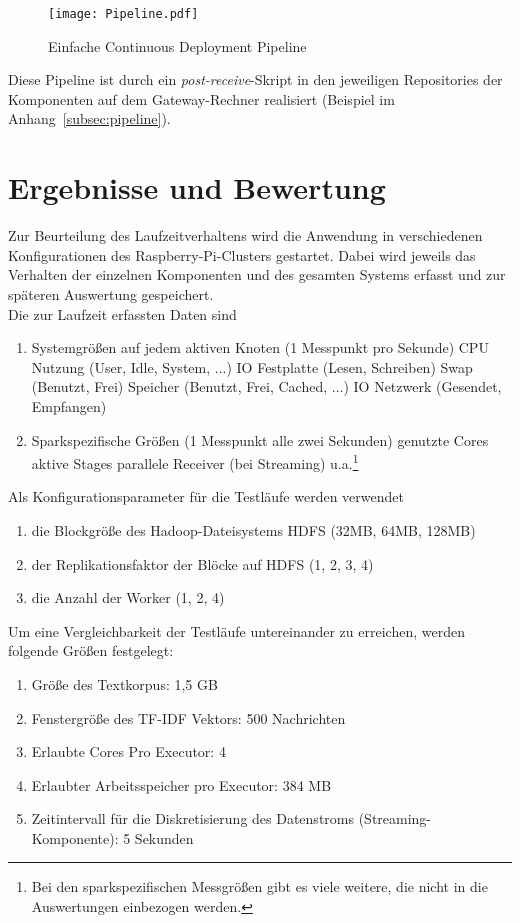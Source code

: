 \begin{figure}[ht!]
	\centering
  \texttt{[image: Pipeline.pdf]}
	\caption{Einfache Continuous Deployment Pipeline}
	\label{figure:cd_pipeline}
\end{figure}

Diese Pipeline ist durch ein \textit{post-receive}-Skript in den jeweiligen Repositories der Komponenten auf dem Gateway-Rechner realisiert (Beispiel im Anhang~\ref{subsec:pipeline}).\\


\section{Ergebnisse und Bewertung}

Zur Beurteilung des Laufzeitverhaltens wird die Anwendung in verschiedenen Konfigurationen des Raspberry-Pi-Clusters gestartet. Dabei wird jeweils das Verhalten der einzelnen Komponenten und des gesamten Systems erfasst und zur späteren Auswertung gespeichert.\\

Die zur Laufzeit erfassten Daten sind
\begin{enumerate}
	\item Systemgrößen auf jedem aktiven Knoten (1 Messpunkt pro Sekunde)
	\subitem CPU Nutzung (User, Idle, System, ...)
	\subitem IO Festplatte (Lesen, Schreiben)
	\subitem Swap (Benutzt, Frei)
	\subitem Speicher (Benutzt, Frei, Cached, ...)
	\subitem IO Netzwerk (Gesendet, Empfangen)
	\item Sparkspezifische Größen (1 Messpunkt alle zwei Sekunden)
	\subitem genutzte Cores
	\subitem aktive Stages
	\subitem parallele Receiver (bei Streaming)
	\subitem u.a.\footnote{Bei den sparkspezifischen Messgrößen gibt es viele weitere, die nicht in die Auswertungen einbezogen werden.}
\end{enumerate}

Als Konfigurationsparameter für die Testläufe werden verwendet
\begin{enumerate}
	\item die Blockgröße des Hadoop-Dateisystems HDFS (32MB, 64MB, 128MB)
	\item der Replikationsfaktor der Blöcke auf HDFS (1, 2, 3, 4)
	\item die Anzahl der Worker (1, 2, 4)
\end{enumerate}

Um eine Vergleichbarkeit der Testläufe untereinander zu erreichen, werden folgende Größen festgelegt:
\begin{enumerate}
	\item Größe des Textkorpus: 1,5 GB
	\item Fenstergröße des TF-IDF Vektors: 500 Nachrichten
	\item Erlaubte Cores Pro Executor: 4
	\item Erlaubter Arbeitsspeicher pro Executor: 384 MB
	\item Zeitintervall für die Diskretisierung des Datenstroms (Streaming-Komponente): 5 Sekunden
\end{enumerate}

